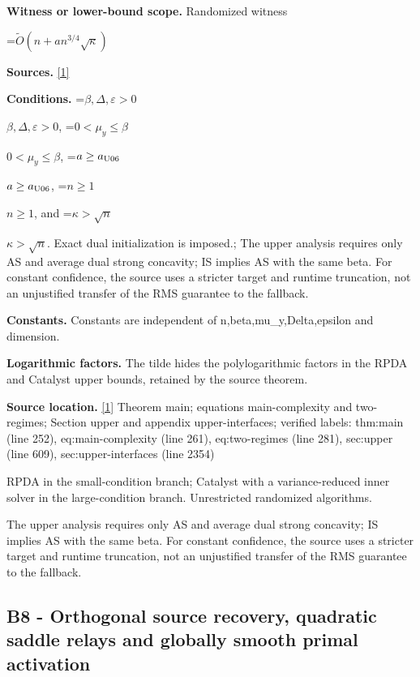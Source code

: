 \documentclass[10pt,a4paper]{article}
\newcommand{\AtlasMath}[1]{\par\begingroup\centering\setbox0=\hbox{$\displaystyle #1$}\ifdim\wd0>1.4\linewidth\typeout{ATLAS WIDE FORMULA: \the\wd0}\fi\ifdim\wd0>\linewidth\resizebox{\linewidth}{!}{\box0}\else\box0\fi\par\endgroup}
\newcommand{\AtlasInlineMath}[1]{\begingroup\setbox0=\hbox{$#1$}\ifdim\wd0>.4\linewidth\endgroup\AtlasMath{#1}\else\endgroup$#1$\fi}
\begin{document}
\textbf{Witness or lower-bound scope.} Randomized witness



\AtlasMath{\widetilde O(n+a n^{3/4}\sqrt\kappa)}


\textbf{Sources.} \href{https://github.com/WU-Wendao/Colombo/blob/main/colombo_sensorium/Complexity_altas/data/sources/colombo/U06/manuscript.pdf}{[1]}



\textbf{Conditions.} \AtlasInlineMath{\beta,\Delta,\varepsilon>0}, \AtlasInlineMath{0<\mu_y\le\beta}, \AtlasInlineMath{a\ge a_{\rm U06}}, \AtlasInlineMath{n\ge1}, and \AtlasInlineMath{\kappa>\sqrt n}. Exact dual initialization is imposed.; The upper analysis requires only AS and average dual strong concavity; IS implies AS with the same beta. For constant confidence, the source uses a stricter target and runtime truncation, not an unjustified transfer of the RMS guarantee to the fallback.



\textbf{Constants.} Constants are independent of n,beta,mu\_y,Delta,epsilon and dimension.



\textbf{Logarithmic factors.} The tilde hides the polylogarithmic factors in the RPDA and Catalyst upper bounds, retained by the source theorem.



\textbf{Source location.} \href{https://github.com/WU-Wendao/Colombo/blob/main/colombo_sensorium/Complexity_altas/data/sources/colombo/U06/manuscript.pdf}{[1]} Theorem main; equations main-complexity and two-regimes; Section upper and appendix upper-interfaces; verified labels: thm:main (line 252), eq:main-complexity (line 261), eq:two-regimes (line 281), sec:upper (line 609), sec:upper-interfaces (line 2354)



RPDA in the small-condition branch; Catalyst with a variance-reduced inner solver in the large-condition branch. Unrestricted randomized algorithms.



The upper analysis requires only AS and average dual strong concavity; IS implies AS with the same beta. For constant confidence, the source uses a stricter target and runtime truncation, not an unjustified transfer of the RMS guarantee to the fallback.



\subsection{B8 - Orthogonal source recovery, quadratic saddle relays and globally smooth primal activation}
\end{document}
